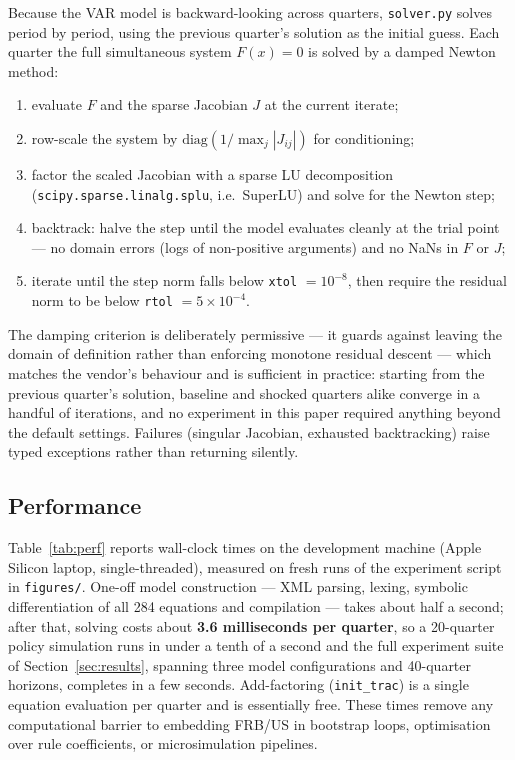 Because the VAR model is backward-looking across quarters, \texttt{solver.py} solves period by period, using the previous quarter's solution as the initial guess. Each quarter the full simultaneous system $F(x)=0$ is solved by a damped Newton method:
\begin{enumerate}
  \item evaluate $F$ and the sparse Jacobian $J$ at the current iterate;
  \item row-scale the system by $\mathrm{diag}(1/\max_j |J_{ij}|)$ for conditioning;
  \item factor the scaled Jacobian with a sparse LU decomposition (\texttt{scipy.sparse.linalg.splu}, i.e.\ SuperLU) and solve for the Newton step;
  \item backtrack: halve the step until the model evaluates cleanly at the trial point --- no domain errors (logs of non-positive arguments) and no NaNs in $F$ or $J$;
  \item iterate until the step norm falls below \texttt{xtol} $=10^{-8}$, then require the residual norm to be below \texttt{rtol} $=5\times10^{-4}$.
\end{enumerate}
The damping criterion is deliberately permissive --- it guards against leaving the domain of definition rather than enforcing monotone residual descent --- which matches the vendor's behaviour and is sufficient in practice: starting from the previous quarter's solution, baseline and shocked quarters alike converge in a handful of iterations, and no experiment in this paper required anything beyond the default settings. Failures (singular Jacobian, exhausted backtracking) raise typed exceptions rather than returning silently.

\subsection{Performance}
\label{sec:performance}

Table~\ref{tab:perf} reports wall-clock times on the development machine (Apple Silicon laptop, single-threaded), measured on fresh runs of the experiment script in \texttt{figures/}. One-off model construction --- XML parsing, lexing, symbolic differentiation of all 284 equations and compilation --- takes about half a second; after that, solving costs about \textbf{3.6 milliseconds per quarter}, so a 20-quarter policy simulation runs in under a tenth of a second and the full experiment suite of Section~\ref{sec:results}, spanning three model configurations and 40-quarter horizons, completes in a few seconds. Add-factoring (\texttt{init\_trac}) is a single equation evaluation per quarter and is essentially free. These times remove any computational barrier to embedding FRB/US in bootstrap loops, optimisation over rule coefficients, or microsimulation pipelines.

